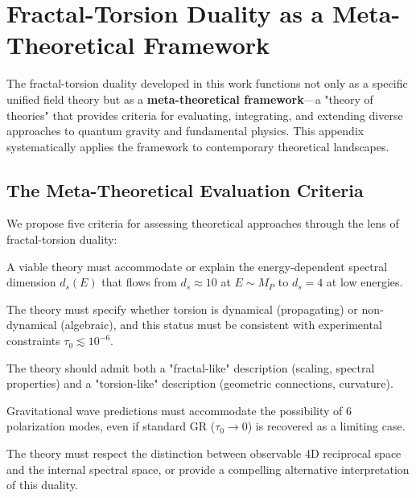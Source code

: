 \section{Fractal-Torsion Duality as a Meta-Theoretical Framework}
\label{app:meta_framework}

The fractal-torsion duality developed in this work functions not only as a specific unified field theory but as a \textbf{meta-theoretical framework}—a "theory of theories" that provides criteria for evaluating, integrating, and extending diverse approaches to quantum gravity and fundamental physics. This appendix systematically applies the framework to contemporary theoretical landscapes.

\subsection{The Meta-Theoretical Evaluation Criteria}

We propose five criteria for assessing theoretical approaches through the lens of fractal-torsion duality:

\begin{criterion}
A viable theory must accommodate or explain the energy-dependent spectral dimension $d_s(E)$ that flows from $d_s \approx 10$ at $E \sim M_P$ to $d_s = 4$ at low energies.
\end{criterion}

\begin{criterion}
The theory must specify whether torsion is dynamical (propagating) or non-dynamical (algebraic), and this status must be consistent with experimental constraints $\tau_0 \lesssim 10^{-6}$.
\end{criterion}

\begin{criterion}
The theory should admit both a "fractal-like" description (scaling, spectral properties) and a "torsion-like" description (geometric connections, curvature).
\end{criterion}

\begin{criterion}
Gravitational wave predictions must accommodate the possibility of 6 polarization modes, even if standard GR ($\tau_0 \to 0$) is recovered as a limiting case.
\end{criterion}

\begin{criterion}
The theory must respect the distinction between observable 4D reciprocal space and the internal spectral space, or provide a compelling alternative interpretation of this duality.
\end{criterion}

